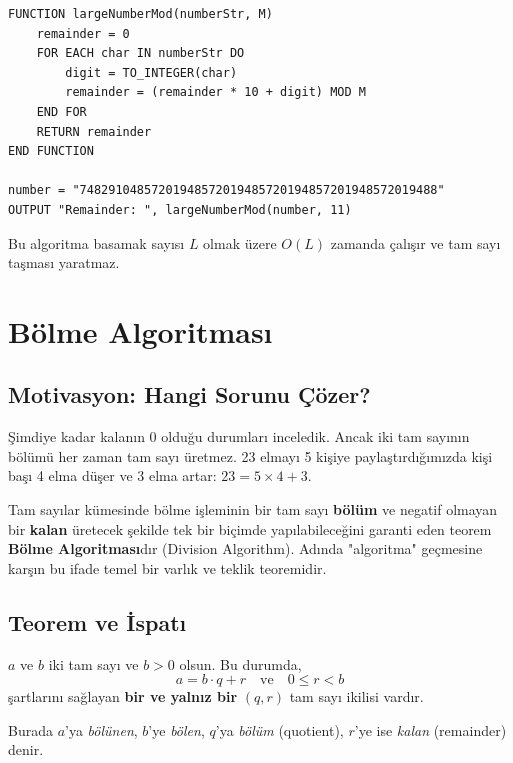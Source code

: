 \begin{lstlisting}
FUNCTION largeNumberMod(numberStr, M)
    remainder = 0
    FOR EACH char IN numberStr DO
        digit = TO_INTEGER(char)
        remainder = (remainder * 10 + digit) MOD M
    END FOR
    RETURN remainder
END FUNCTION

number = "74829104857201948572019485720194857201948572019488"
OUTPUT "Remainder: ", largeNumberMod(number, 11)\end{lstlisting}

Bu algoritma basamak sayısı $L$ olmak üzere $O(L)$ zamanda çalışır ve tam sayı taşması yaratmaz.

\section{Bölme Algoritması}

\subsection{Motivasyon: Hangi Sorunu Çözer?}
Şimdiye kadar kalanın 0 olduğu durumları inceledik. Ancak iki tam sayının bölümü her zaman tam sayı üretmez. 23 elmayı 5 kişiye paylaştırdığımızda kişi başı 4 elma düşer ve 3 elma artar: $23 = 5 \times 4 + 3$.

Tam sayılar kümesinde bölme işleminin bir tam sayı \textbf{bölüm} ve negatif olmayan bir \textbf{kalan} üretecek şekilde tek bir biçimde yapılabileceğini garanti eden teorem \textbf{Bölme Algoritması}dır (Division Algorithm). Adında "algoritma" geçmesine karşın bu ifade temel bir varlık ve teklik teoremidir.

\subsection{Teorem ve İspatı}

\begin{theorem}
$a$ ve $b$ iki tam sayı ve $b > 0$ olsun. Bu durumda,
\[
a = b \cdot q + r \quad \text{ve} \quad 0 \le r < b
\]
şartlarını sağlayan \textbf{bir ve yalnız bir} $(q, r)$ tam sayı ikilisi vardır.
\end{theorem}

Burada $a$'ya \emph{bölünen}, $b$'ye \emph{bölen}, $q$'ya \emph{bölüm} (quotient), $r$'ye ise \emph{kalan} (remainder) denir.

